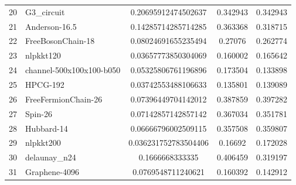 \begin{tabular}{|l|l|S[round-mode=places,round-precision=4]|S[round-mode=places,round-precision=4]|S[round-mode=places,round-precision=4]|}
{20}& {	G3\_circuit                }	& 0.20695912474502637	& 0.342943	& 0.342943	\\
{21}& {	Anderson-16.5             }	& 0.14285714285714285	& 0.363368	& 0.318715	\\
{22}& {	FreeBosonChain-18         }	& 0.08024691655235494	& 0.27076	& 0.262774	\\
{23}& {	nlpkkt120                 }	& 0.03657773850304069	& 0.160002	& 0.165642	\\
{24}& {	channel-500x100x100-b050  }	& 0.05325806761196896	& 0.173504	& 0.133898	\\
{25}& {	HPCG-192                  }	& 0.03742553488106633	& 0.135801	& 0.139089	\\
{26}& {	FreeFermionChain-26       }	& 0.07396449704142012	& 0.387859	& 0.397282	\\
{27}& {	Spin-26                   }	& 0.07142857142857142	& 0.367034	& 0.351781	\\
{28}& {	Hubbard-14                }	& 0.06666796002509115	& 0.357508	& 0.359807	\\
{29}& {	nlpkkt200                 }	& 0.036231752783504406	& 0.16692	& 0.172028	\\
{30}& {	delaunay\_n24              }	& 0.1666668333335	& 0.406459	& 0.319197	\\
{31}& {	Graphene-4096             }	& 0.0769548711240621	& 0.160392	& 0.142912	\\
\bottomrule
\end{tabular}



